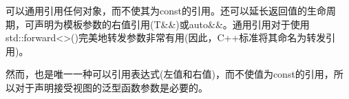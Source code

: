 


可以通用引用任何对象，而不使其为const的引用。还可以延长返回值的生命周期，可声明为模板参数的右值引用(T\&\&)或auto\&\&。通用引用对于使用std::forward<>()完美地转发参数非常有用(因此，C++标准将其命名为转发引用)。

然而，也是唯一一种可以引用表达式(左值和右值)，而不使值为const的引用，所以对于声明接受视图的泛型函数参数是必要的。

